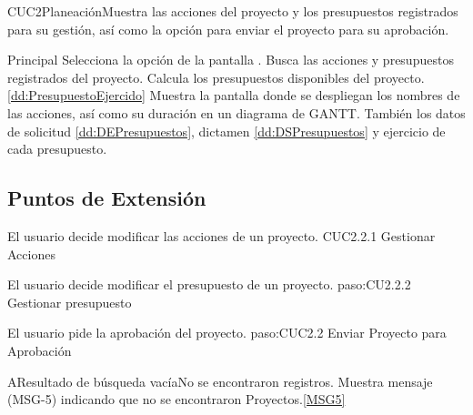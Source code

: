 
  \begin{UseCase}{CUC2}{Planeación}{Muestra las acciones del proyecto y los presupuestos registrados para su gestión, así como la opción para enviar el proyecto para su aprobación.}
  \end{UseCase}

  \begin{UCtrayectoria}{Principal}
    \UCpaso[\UCactor] Selecciona la opción  de la pantalla .
    \UCpaso Busca las acciones y presupuestos registrados del proyecto.
    \UCpaso Calcula los presupuestos disponibles del proyecto.  \ref{dd:PresupuestoEjercido}  %
    \UCpaso Muestra la pantalla  donde se despliegan los nombres de las acciones, así como su duración en un diagrama de GANTT. También los datos de solicitud \ref{dd:DEPresupuestos}, dictamen \ref{dd:DSPresupuestos} y ejercicio de cada presupuesto.
  \end{UCtrayectoria}

\subsection{Puntos de Extensión}
	{El usuario decide modificar las acciones de un proyecto.}
	{CUC2.2.1 Gestionar Acciones}
	{}

	{El usuario decide modificar el presupuesto de un proyecto.}
	{paso:CU2.2.2 Gestionar presupuesto}
	{}

	{El usuario pide la aprobación del proyecto.}
	{paso:CUC2.2 Enviar Proyecto para Aprobación}
	{}

  \begin{UCtrayectoriaA}{A}{Resultado de búsqueda vacía}{No se encontraron registros.}
    \UCpaso Muestra mensaje (MSG-5) indicando que no se encontraron Proyectos.\ref{MSG5}
  \end{UCtrayectoriaA}

